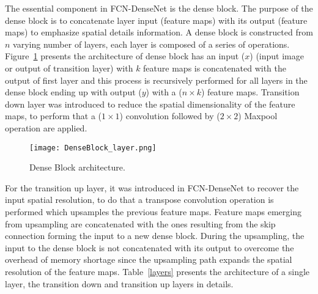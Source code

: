 	The essential component in FCN-DenseNet is the dense block.
	The purpose of the dense block is to concatenate layer input (feature maps) with its output (feature maps) to emphasize spatial details information.
	A dense block is constructed from \(n\) varying number of layers, each layer is composed of a series of operations.
	Figure~\ref{dense_block} presents the architecture of dense block has an input (\(x\)) (input image or output of transition layer) with \(k\) feature maps is concatenated with the output of first layer and this process is recursively performed for all layers in the dense block ending up with output (\(y\)) with a (\(n\times k\)) feature maps. 
	Transition down layer was introduced to reduce the spatial dimensionality of the feature maps, to perform that a (\(1\times 1\))  convolution followed by (\(2\times2\)) Maxpool operation are applied. 

	\begin{figure} [h!]
		\begin{center}
			\texttt{[image: DenseBlock\_layer.png]}
		\end{center}
		\caption{Dense Block architecture.} 
		\label{dense_block}
	\end{figure}

	For the transition up layer, it was introduced in FCN-DenseNet to recover the input spatial resolution, to do that a transpose convolution operation is performed which upsamples the previous feature maps.
	Feature maps emerging from upsampling are concatenated with the ones resulting from the skip connection forming the input to a new dense block.
	During the upsampling, the input to the dense block is not concatenated with its output to overcome the overhead of memory shortage since the upsampling path expands the spatial resolution of the feature maps.
	Table~\ref{layers} presents the architecture of a single layer, the transition down  and transition up layers in details.

